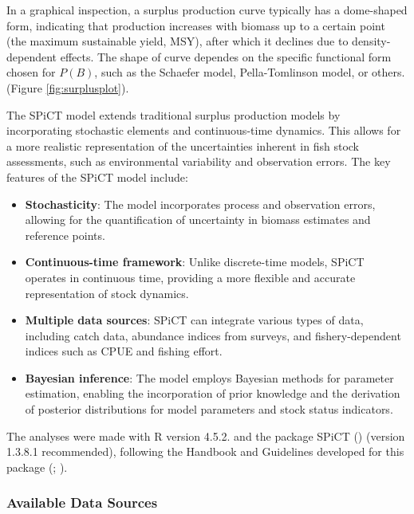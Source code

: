 \documentclass[
  12pt,
]{article}
\begin{document}
In a graphical inspection, a surplus production curve typically has a dome-shaped form, indicating that production increases with biomass up to a certain point (the maximum sustainable yield, MSY), after which it declines due to density-dependent effects. The shape of curve dependes on the specific functional form chosen for \(P(B)\), such as the Schaefer model, Pella-Tomlinson model, or others. (Figure \ref{fig:surplusplot}).

The SPiCT model extends traditional surplus production models by incorporating stochastic elements and continuous-time dynamics. This allows for a more realistic representation of the uncertainties inherent in fish stock assessments, such as environmental variability and observation errors. The key features of the SPiCT model include:

\begin{itemize}
\item
  \textbf{Stochasticity}: The model incorporates process and observation errors, allowing for the quantification of uncertainty in biomass estimates and reference points.
\item
  \textbf{Continuous-time framework}: Unlike discrete-time models, SPiCT operates in continuous time, providing a more flexible and accurate representation of stock dynamics.
\item
  \textbf{Multiple data sources}: SPiCT can integrate various types of data, including catch data, abundance indices from surveys, and fishery-dependent indices such as CPUE and fishing effort.
\item
  \textbf{Bayesian inference}: The model employs Bayesian methods for parameter estimation, enabling the incorporation of prior knowledge and the derivation of posterior distributions for model parameters and stock status indicators.
\end{itemize}

The analyses were made with R version 4.5.2. and the package SPiCT () (version 1.3.8.1 recommended), following the Handbook and Guidelines developed for this package (; ).

\subsubsection{Available Data Sources}\label{available-data-sources}
\end{document}

